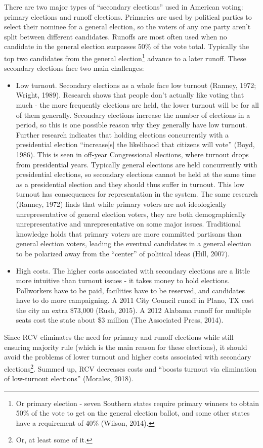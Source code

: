 \documentclass[12pt,twoside]{reedthesis}
\begin{document}
There are two major types of ``secondary elections'' used in American voting: primary elections and runoff elections. Primaries are used by political parties to select their nominee for a general election, so the voters of any one party aren't split between different candidates. Runoffs are most often used when no candidate in the general election surpasses 50\% of the vote total. Typically the top two candidates from the general election\footnote{Or primary election - seven Southern states require primary winners to obtain 50\% of the vote to get on the general election ballot, and some other states have a requirement of 40\% (Wilson, 2014).} advance to a later runoff. These secondary elections face two main challenges:
\begin{itemize}
\item
  Low turnout. Secondary elections as a whole face low turnout (Ranney, 1972; Wright, 1989). Research shows that people don't actually like voting that much - the more frequently elections are held, the lower turnout will be for all of them generally. Secondary elections increase the number of elections in a period, so this is one possible reason why they generally have low turnout. Further research indicates that holding elections concurrently with a presidential election ``increase{[}s{]} the likelihood that citizens will vote'' (Boyd, 1986). This is seen in off-year Congressional elections, where turnout drops from presidential years. Typically general elections are held concurrently with presidential elections, so secondary elections cannot be held at the same time as a presidential election and they should thus suffer in turnout. This low turnout has consequences for representation in the system. The same research (Ranney, 1972) finds that while primary voters are not ideologically unrepresentative of general election voters, they are both demographically unrepresentative and unrepresentative on some major issues. Traditional knowledge holds that primary voters are more committed partisans than general election voters, leading the eventual candidates in a general election to be polarized away from the ``center'' of political ideas (Hill, 2007).
\item
  High costs. The higher costs associated with secondary elections are a little more intuitive than turnout issues - it takes money to hold elections. Pollworkers have to be paid, facilities have to be reserved, and candidates have to do more campaigning. A 2011 City Council runoff in Plano, TX cost the city an extra \$73,000 (Rush, 2015). A 2012 Alabama runoff for multiple seats cost the state about \$3 million (The Associated Press, 2014).
\end{itemize}
Since RCV eliminates the need for primary and runoff elections while still ensuring majority rule (which is the main reason for these elections), it should avoid the problems of lower turnout and higher costs associated with secondary elections\footnote{Or, at least some of it.}. Summed up, RCV decreases costs and ``boosts turnout via elimination of low-turnout elections'' (Morales, 2018).
\end{document}
